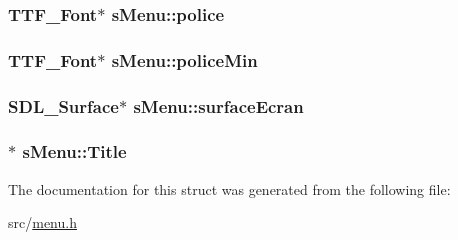 \hypertarget{structs_menu_a9b0a8085e6305f21d8a4760ad1adcf1e}{
\subsubsection[{police}]{\setlength{\rightskip}{0pt plus 5cm}T\-T\-F\-\_\-\-Font$\ast$ s\-Menu\-::police}}\label{structs_menu_a9b0a8085e6305f21d8a4760ad1adcf1e}
\hypertarget{structs_menu_a2cdd8a1ea767c51bf201c34c2973f876}{
\subsubsection[{police\-Min}]{\setlength{\rightskip}{0pt plus 5cm}T\-T\-F\-\_\-\-Font$\ast$ s\-Menu\-::police\-Min}}\label{structs_menu_a2cdd8a1ea767c51bf201c34c2973f876}
\hypertarget{structs_menu_a95c803d0d70319d9adde92ef353b183c}{
\subsubsection[{surface\-Ecran}]{\setlength{\rightskip}{0pt plus 5cm}S\-D\-L\-\_\-\-Surface$\ast$ s\-Menu\-::surface\-Ecran}}\label{structs_menu_a95c803d0d70319d9adde92ef353b183c}
\hypertarget{structs_menu_a2551447b30a0bc7136a538f59d537260}{
\subsubsection[{Title}]{$\ast$ s\-Menu\-::\-Title}}\label{structs_menu_a2551447b30a0bc7136a538f59d537260}


The documentation for this struct was generated from the following file\-:\begin{DoxyCompactItemize}
\item 
src/\hyperlink{menu_8h}{menu.\-h}\end{DoxyCompactItemize}
